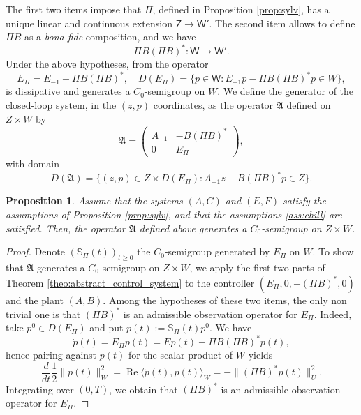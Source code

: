 \documentclass[10pt]{article}
\newcommand{\opRe}{\operatorname{Re}}
\newtheorem{Proposition}[Theorem]{Proposition}
\begin{document}
The first two items impose that $\Pi$, defined in Proposition \ref{prop:sylv}, has a unique linear and continuous extension $\mathsf{Z} \rightarrow \mathsf{W}'$. The second item allows to define $\Pi B$ as a \textit{bona fide} composition, and we have 
\[
\Pi B (\Pi B)^* : \mathsf{W} \rightarrow \mathsf{W}'.
\]
Under the above hypotheses, from \cite[Lemma 2.2]{chill} the operator 
\[
E_\Pi = E_{-1} - \Pi B (\Pi B)^*,\quad D(E_\Pi) = \{ p \in \mathsf{W} : E_{-1}p - \Pi B (\Pi B)^*p \in W\},
\]
is dissipative and generates a $C_0$-semigroup on $W$. We define the generator of the closed-loop system, in the $(z,p)$ coordinates, as the operator $\mathfrak{A}$ defined on $Z \times W$ by
\[
\mathfrak{A} = \left( \begin{array}{cc}
A_{-1} & -B(\Pi B)^* \\
0 & E_\Pi
\end{array} \right),
\]
with domain
\[
D(\mathfrak{A}) = \{ (z,p) \in Z \times D(E_\Pi) : A_{-1}z -B(\Pi B)^*p \in Z\}.
\]
\begin{Proposition}\label{prop:closed_loop} Assume that the systems $(A,C)$ and $(E,F)$ satisfy the assumptions of Proposition \ref{prop:sylv}, and that  the assumptions \ref{ass:chill} are satisfied. Then, the operator $\mathfrak{A}$ defined above generates a $C_0$-semigroup on $Z \times W$. 
\end{Proposition}
\begin{proof}
Denote $(\mathbb{S}_\Pi(t))_{t\geq 0}$ the $C_0$-semigroup generated by $E_\Pi$ on $W$. To show that $\mathfrak{A}$ generates a $C_0$-semigroup on $Z \times W$, we apply the first two parts of Theorem \ref{theo:abstract_control_system} to the controller $(E_\Pi,0,-(\Pi B)^*,0)$ and the plant $(A,B)$. Among the hypotheses of these two items, the only non trivial one is that $(\Pi B)^*$ is an admissible observation operator for $E_\Pi$. Indeed, take $p^0 \in D(E_\Pi)$ and put $p(t) := \mathbb{S}_\Pi(t)p^0$. We have 
\[
\dot{p}(t) = E_\Pi p(t) = E p(t) - \Pi B (\Pi B)^*p(t),
\]
hence pairing against $p(t)$ for the scalar product of $W$ yields 
\begin{equation}\label{eq:PiB_admissible}
\frac{d}{dt} \frac{1}{2} \|p(t)\|_W^2 =   \opRe \langle \dot{p}(t) , p(t) \rangle_W =  -\|(\Pi B)^*p(t) \|_U^2.    
\end{equation}
Integrating over $(0,T)$, we obtain that $(\Pi B)^*$ is an admissible observation operator for $E_\Pi$.
\end{proof}
\end{document}
